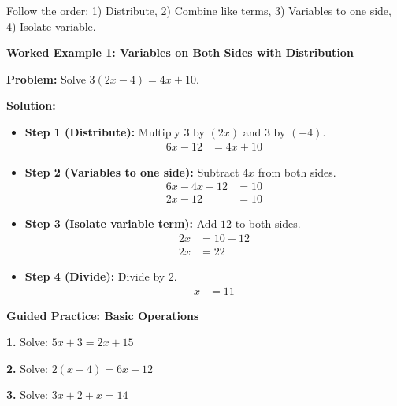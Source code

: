 \documentclass[12pt, letterpaper, fleqn]{article}
\begin{document}
\noindent
Follow the order: 1) Distribute, 2) Combine like terms, 3) Variables to one side, 4) Isolate variable.

\vspace{3mm}

\begin{tcolorbox}[colback=white, colframe=black!25, boxrule=0.6pt, arc=4mm, left=6mm, right=6mm, top=5mm, bottom=5mm]

\textbf{Worked Example 1: Variables on Both Sides with Distribution}

\medskip

\textbf{Problem:} Solve $3(2x - 4) = 4x + 10$.

\medskip

\textbf{Solution:}
\begin{itemize}
    \item \textbf{Step 1 (Distribute):} Multiply $3$ by $(2x)$ and $3$ by $(-4)$.
    \begin{align*}
        6x - 12 &= 4x + 10
    \end{align*}
    \item \textbf{Step 2 (Variables to one side):} Subtract $4x$ from both sides.
    \begin{align*}
        6x - 4x - 12 &= 10 \\
        2x - 12 &= 10
    \end{align*}
    \item \textbf{Step 3 (Isolate variable term):} Add $12$ to both sides.
    \begin{align*}
        2x &= 10 + 12 \\
        2x &= 22
    \end{align*}
    \item \textbf{Step 4 (Divide):} Divide by $2$.
    \begin{align*}
        x &= 11
    \end{align*}
\end{itemize}

\end{tcolorbox}

\vspace{4mm}

\begin{tcolorbox}[colback=white!15, colframe=black, boxrule=1.5pt, arc=4mm, left=6mm, right=6mm, top=5mm, bottom=5mm]

\textbf{Guided Practice: Basic Operations}

\medskip

\noindent
\textbf{1.} Solve: $5x + 3 = 2x + 15$
\vspace{2.5cm}

\noindent
\textbf{2.} Solve: $2(x + 4) = 6x - 12$
\vspace{2.5cm}

\noindent
\textbf{3.} Solve: $3x + 2 + x = 14$
\vspace{2.5cm}

\end{tcolorbox}
\end{document}
